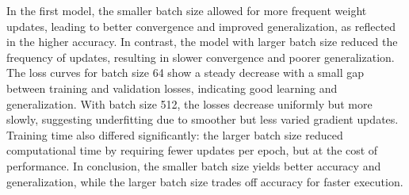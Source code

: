 \documentclass[12pt,a4paper]{article}
\begin{document}
        In the first model, the smaller batch size allowed for more frequent weight updates, leading to better convergence and improved generalization, as reflected in the higher accuracy. In contrast, the model with larger batch size reduced the frequency of updates, resulting in slower convergence and poorer generalization. The loss curves for batch size 64 show a steady decrease with a small gap between training and validation losses, indicating good learning and generalization. With batch size 512, the losses decrease uniformly but more slowly, suggesting underfitting due to smoother but less varied gradient updates. Training time also differed significantly: the larger batch size reduced computational time by requiring fewer updates per epoch, but at the cost of performance. In conclusion, the smaller batch size yields better accuracy and generalization, while the larger batch size trades off accuracy for faster execution.
    
\end{document}
